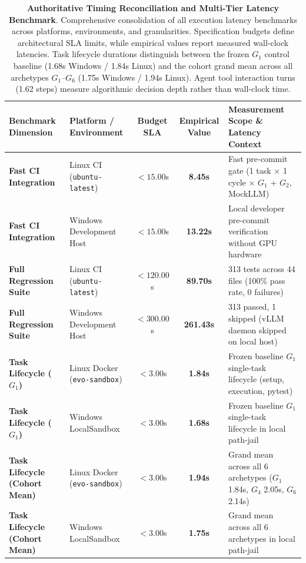 \begin{table}[t]
\centering
\small
\caption{\textbf{Authoritative Timing Reconciliation and Multi-Tier Latency Benchmark}. Comprehensive consolidation of all execution latency benchmarks across platforms, environments, and granularities. Specification budgets define architectural SLA limits, while empirical values report measured wall-clock latencies. Task lifecycle durations distinguish between the frozen $G_1$ control baseline (1.68s Windows / 1.84s Linux) and the cohort grand mean across all archetypes $G_1$--$G_6$ (1.75s Windows / 1.94s Linux). Agent tool interaction turns (1.62 steps) measure algorithmic decision depth rather than wall-clock time.}
\label{tab:timing_reconciliation}
\begin{tabular}{llccp{7.2cm}}
\toprule
\textbf{Benchmark Dimension} & \textbf{Platform / Environment} & \textbf{Budget SLA} & \textbf{Empirical Value} & \textbf{Measurement Scope \& Latency Context} \\
\midrule
\textbf{Fast CI Integration} & Linux CI (\texttt{ubuntu-latest}) & $< 15.00$s & \textbf{8.45s} & Fast pre-commit gate (1 task $\times$ 1 cycle $\times$ $G_1$ + $G_2$, MockLLM) \\
\textbf{Fast CI Integration} & Windows Development Host & $< 15.00$s & \textbf{13.22s} & Local developer pre-commit verification without GPU hardware \\
\midrule
\textbf{Full Regression Suite} & Linux CI (\texttt{ubuntu-latest}) & $< 120.00$s & \textbf{89.70s} & 313 tests across 44 files (100\% pass rate, 0 failures) \\
\textbf{Full Regression Suite} & Windows Development Host & $< 300.00$s & \textbf{261.43s} & 313 passed, 1 skipped (vLLM daemon skipped on local host) \\
\midrule
\textbf{Task Lifecycle ($G_1$)} & Linux Docker (\texttt{evo-sandbox}) & $< 3.00$s & \textbf{1.84s} & Frozen baseline $G_1$ single-task lifecycle (setup, execution, pytest) \\
\textbf{Task Lifecycle ($G_1$)} & Windows LocalSandbox & $< 3.00$s & \textbf{1.68s} & Frozen baseline $G_1$ single-task lifecycle in local path-jail \\
\textbf{Task Lifecycle (Cohort Mean)} & Linux Docker (\texttt{evo-sandbox}) & $< 3.00$s & \textbf{1.94s} & Grand mean across all 6 archetypes ($G_1$ 1.84s, $G_4$ 2.05s, $G_6$ 2.14s) \\
\textbf{Task Lifecycle (Cohort Mean)} & Windows LocalSandbox & $< 3.00$s & \textbf{1.75s} & Grand mean across all 6 archetypes in local path-jail \\

\end{tabular}
\end{table}
